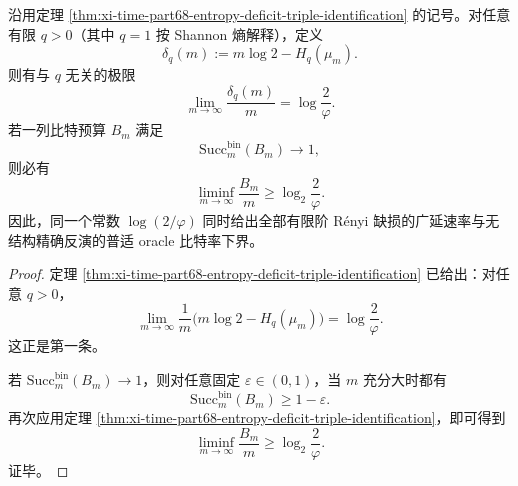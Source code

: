 \begin{corollary}\label{cor:conclusion-renyi-universal-defect-oracle-rate-identification}
沿用定理 \ref{thm:xi-time-part68-entropy-deficit-triple-identification} 的记号。对任意有限 \(q>0\)（其中 \(q=1\) 按 Shannon 熵解释），定义
\[
\delta_q(m):=m\log 2-H_q(\mu_m).
\]
则有与 \(q\) 无关的极限
\[
\lim_{m\to\infty}\frac{\delta_q(m)}{m}
=
\log\frac{2}{\varphi}.
\]
若一列比特预算 \(B_m\) 满足
\[
\mathrm{Succ}_m^{\mathrm{bin}}(B_m)\longrightarrow 1,
\]
则必有
\[
\liminf_{m\to\infty}\frac{B_m}{m}
\ge
\log_2\frac{2}{\varphi}.
\]
因此，同一个常数 \(\log(2/\varphi)\) 同时给出全部有限阶 R\'enyi 缺损的广延速率与无结构精确反演的普适 oracle 比特率下界。
\end{corollary}
\begin{proof}
定理 \ref{thm:xi-time-part68-entropy-deficit-triple-identification} 已给出：对任意 \(q>0\)，
\[
\lim_{m\to\infty}\frac{1}{m}\bigl(m\log 2-H_q(\mu_m)\bigr)=\log\frac{2}{\varphi}.
\]
这正是第一条。

若 \(\mathrm{Succ}_m^{\mathrm{bin}}(B_m)\to 1\)，则对任意固定 \(\varepsilon\in(0,1)\)，当 \(m\) 充分大时都有
\[
\mathrm{Succ}_m^{\mathrm{bin}}(B_m)\ge 1-\varepsilon.
\]
再次应用定理 \ref{thm:xi-time-part68-entropy-deficit-triple-identification}，即可得到
\[
\liminf_{m\to\infty}\frac{B_m}{m}\ge \log_2\frac{2}{\varphi}.
\]
证毕。
\end{proof}

